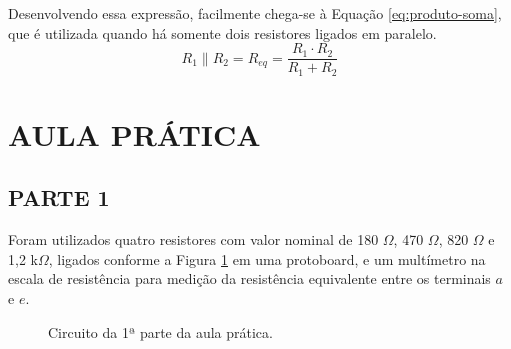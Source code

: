 \documentclass[12pt]{article}
\begin{document}
    Desenvolvendo essa expressão, facilmente chega-se à Equação \ref{eq:produto-soma}, que é utilizada quando há somente dois resistores ligados em paralelo.
    \begin{equation}
        \label{eq:produto-soma}
        R_1\parallel R_2 = R_{eq}=\frac{R_1\cdot R_2}{R_1+R_2}
    \end{equation}

    \section{AULA PRÁTICA}
    \subsection{PARTE 1}
    Foram utilizados quatro resistores com valor nominal de 180 $\Omega$, 470 $\Omega$, 820 $\Omega$ e 1,2 k$\Omega$, ligados conforme a Figura \ref{fig:circuito-parte1} em uma protoboard, e um multímetro na escala de resistência para medição da resistência equivalente entre os terminais $a$ e $e$.
    \begin{figure}[H]
        \centering
        \caption{Circuito da 1ª parte da aula prática.}
        \label{fig:circuito-parte1}
    \end{figure}
\end{document}
